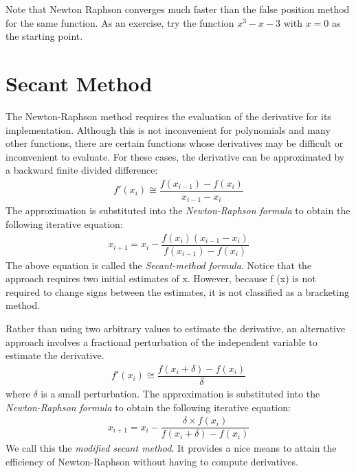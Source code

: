 \documentclass[book.tex]{subfiles}
\begin{document}
Note that Newton Raphson converges much faster than the false position method for the same function. As an exercise, try the function $x^3-x-3$ with $x=0$ as the starting point.

\section{Secant Method}
The Newton-Raphson method requires the evaluation of the derivative for its implementation. Although this is not inconvenient for polynomials and many other functions, there are certain functions whose derivatives may be difficult or inconvenient to evaluate. For these cases, the derivative can be approximated by a backward finite divided difference:
\begin{align}
 f'(x_i) \cong \dfrac{f(x_{i-1}) - f(x_{i})}{x_{i-1} - x_{i}}
\end{align}
The approximation is substituted into the \textit{Newton-Raphson formula} to obtain the following iterative equation:
\begin{align}
 x_{i+1} = x_i - \dfrac{f(x_i)(x_{i-1} - x_{i})}{f(x_{i-1}) - f(x_{i})}
\end{align}
The above equation is called the \textit{Secant-method formula}. Notice that the approach requires two initial estimates of x. However, because f (x) is not required to change signs between the estimates, it is not classified as a bracketing method.

Rather than using two arbitrary values to estimate the derivative, an alternative
approach involves a fractional perturbation of the independent variable to estimate the derivative.
\begin{align}
 f'(x_i) \cong \dfrac{f(x_{i} + \delta) - f(x_{i})}{\delta}
\end{align}
where $\delta$ is a small perturbation. The approximation is substituted into the \textit{Newton-Raphson formula} to obtain the following iterative equation:
\begin{align}
 x_{i+1} = x_i - \dfrac{\delta \times f(x_i)}{f(x_{i} + \delta) - f(x_{i})}
\end{align}
We call this the \textit{modified secant method}. It provides a nice means to attain the efficiency of Newton-Raphson without having to compute derivatives.
\end{document}
